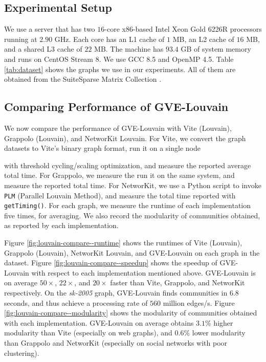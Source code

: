 \subsection{Experimental Setup}
\label{sec:setup}

We use a server that has two $16$-core x86-based Intel Xeon Gold 6226R processors running at $2.90$ GHz. Each core has an L1 cache of $1$ MB, an L2 cache of $16$ MB, and a shared L3 cache of $22$ MB. The machine has $93.4$ GB of system memory and runs on CentOS Stream 8. We use GCC 8.5 and OpenMP 4.5. Table \ref{tab:dataset} shows the graphs we use in our experiments. All of them are obtained from the SuiteSparse Matrix Collection \cite{suite19}.







\subsection{Comparing Performance of GVE-Louvain}

We now compare the performance of GVE-Louvain with Vite (Louvain), Grappolo (Louvain), and NetworKit Louvain. For Vite, we convert the graph datasets to Vite's binary graph format, run it on a single node with threshold cycling/scaling optimization, and measure the reported average total time. For Grappolo, we measure the run it on the same system, and measure the reported total time. For NetworKit, we use a Python script to invoke \texttt{PLM} (Parallel Louvain Method), and measure the total time reported with \texttt{getTiming()}. For each graph, we measure the runtime of each implementation five times, for averaging. We also record the modularity of communities obtained, as reported by each implementation.

Figure \ref{fig:louvain-compare--runtime} shows the runtimes of Vite (Louvain), Grappolo (Louvain), NetworKit Louvain, and GVE-Louvain on each graph in the dataset. Figure \ref{fig:louvain-compare--speedup} shows the speedup of GVE-Louvain with respect to each implementation mentioned above. GVE-Louvain is on average $50\times$, $22\times$, and $20\times$ faster than Vite, Grappolo, and NetworKit respectively. On the \textit{sk-2005} graph, GVE-Louvain finds communities in $6.8$ seconds, and thus achieve a processing rate of $560$ million edges/s. Figure \ref{fig:louvain-compare--modularity} shows the modularity of communities obtained with each implementation. GVE-Louvain on average obtains $3.1\%$ higher modularity than Vite (especially on web graphs), and $0.6\%$ lower modularity than Grappolo and NetworKit (especially on social networks with poor clustering).


